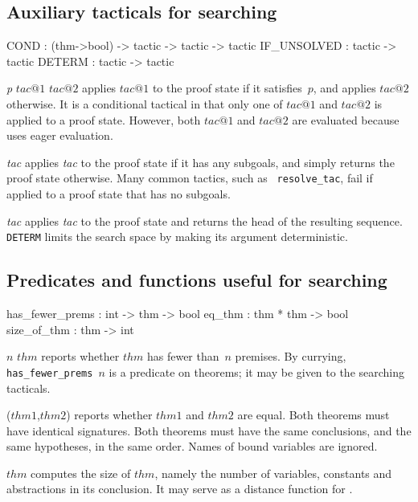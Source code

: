 \subsection{Auxiliary tacticals for searching}
\begin{ttbox} 
COND        : (thm->bool) -> tactic -> tactic -> tactic
IF_UNSOLVED : tactic -> tactic
DETERM      : tactic -> tactic
\end{ttbox}
\begin{ttdescription}
\item[\ttindexbold{COND} {\it p} $tac@1$ $tac@2$] 
applies $tac@1$ to the proof state if it satisfies~$p$, and applies $tac@2$
otherwise.  It is a conditional tactical in that only one of $tac@1$ and
$tac@2$ is applied to a proof state.  However, both $tac@1$ and $tac@2$ are
evaluated because \ML{} uses eager evaluation.

\item[\ttindexbold{IF_UNSOLVED} {\it tac}] 
applies {\it tac\/} to the proof state if it has any subgoals, and simply
returns the proof state otherwise.  Many common tactics, such as {\tt
resolve_tac}, fail if applied to a proof state that has no subgoals.

\item[\ttindexbold{DETERM} {\it tac}] 
applies {\it tac\/} to the proof state and returns the head of the
resulting sequence.  {\tt DETERM} limits the search space by making its
argument deterministic.
\end{ttdescription}


\subsection{Predicates and functions useful for searching}
\begin{ttbox} 
has_fewer_prems : int -> thm -> bool
eq_thm          : thm * thm -> bool
size_of_thm     : thm -> int
\end{ttbox}
\begin{ttdescription}
\item[\ttindexbold{has_fewer_prems} $n$ $thm$] 
reports whether $thm$ has fewer than~$n$ premises.  By currying,
\hbox{\tt has_fewer_prems $n$} is a predicate on theorems; it may 
be given to the searching tacticals.

\item[\ttindexbold{eq_thm}($thm1$,$thm2$)] 
reports whether $thm1$ and $thm2$ are equal.  Both theorems must have
identical signatures.  Both theorems must have the same conclusions, and
the same hypotheses, in the same order.  Names of bound variables are
ignored.

\item[\ttindexbold{size_of_thm} $thm$] 
computes the size of $thm$, namely the number of variables, constants and
abstractions in its conclusion.  It may serve as a distance function for 
. 
\end{ttdescription}

